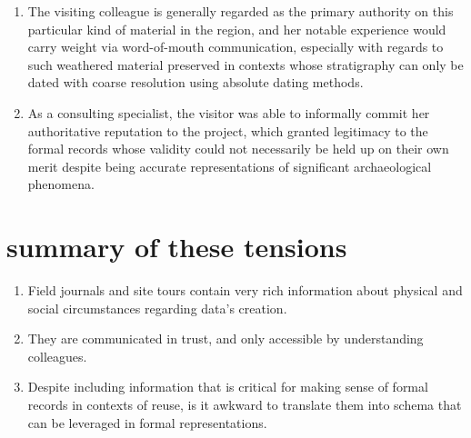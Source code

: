 \documentclass{article}
\begin{document}
\begin{enumerate}
  \item The visiting colleague is generally regarded as the primary authority on this particular kind of material in the region, and her notable experience would carry weight via word-of-mouth communication, especially with regards to such weathered material preserved in contexts whose stratigraphy can only be dated with coarse resolution using absolute dating methods.
  \item As a consulting specialist, the visitor was able to informally commit her authoritative reputation to the project, which granted legitimacy to the formal records whose validity could not necessarily be held up on their own merit despite being accurate representations of significant archaeological phenomena.
\end{enumerate}

\section{summary of these tensions}
\begin{enumerate}
  \item Field journals and site tours contain very rich information about physical and social circumstances regarding data’s creation.
  \item They are communicated in trust, and only accessible by understanding colleagues.
  \item Despite including information that is critical for making sense of formal records in contexts of reuse, is it awkward to translate them into schema that can be leveraged in formal representations.
\end{enumerate}
\end{document}
